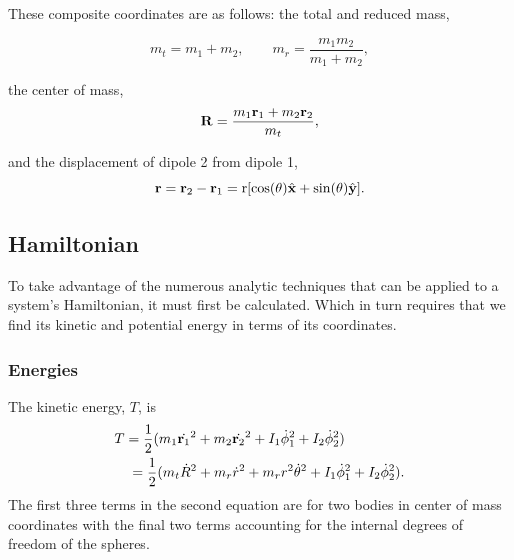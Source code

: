 \documentclass[prbg,preprint]{revtex4-1}
\newcommand{\cvec}[1]{{\rm{\bf{#1}}}}
\begin{document}
These composite coordinates are as follows: the total and reduced mass,

\begin{equation}
m_t = m_1+m_2,
\qquad
m_r = \frac{m_1m_2}{m_1+m_2},
\end{equation}

the center of mass,
\begin{equation}
\cvec{R} = \frac{m_1 \cvec{r}_1+m_2 \cvec{r}_2}{m_t},
\end{equation}

and the displacement of dipole 2 from dipole 1,
\begin{equation}
\cvec{r}
=  \cvec r_2-\cvec r_1 
= \textrm{r} [\cos(\theta) \hat {\cvec x}+\sin(\theta) \hat {\cvec y}].
\end{equation}


\subsection{Hamiltonian}
To take advantage of the numerous analytic techniques that can be applied to a system's Hamiltonian, it must first be calculated. Which in turn requires that we find its kinetic and potential energy in terms of its coordinates.
\subsubsection{Energies}
The kinetic energy, $T$, is \cite{taylor2005classical}
\begin{equation}
	\begin{multlined}
            T = 
            \frac{1}{2}(
            	m_1 \dot {\cvec{r}_1}^2
            	+m_2 \dot {\cvec{r}_2}^2
            	+ I_1 \dot \phi_1^2
            	+ I_2 \dot \phi_2^2
            )
            \\
            =\frac{1}{2}(
            	m_t \dot R^2
            	+m_r \dot r^2
            	+m_r r^2 \dot \theta^2
            	+ I_1 \dot \phi_1^2
            	+ I_2 \dot \phi_2^2
).
  \end{multlined}
\end{equation}
The first three terms in the second equation are for two bodies in center of mass coordinates with the final two terms accounting for the internal degrees of freedom of the spheres. 
\end{document}
